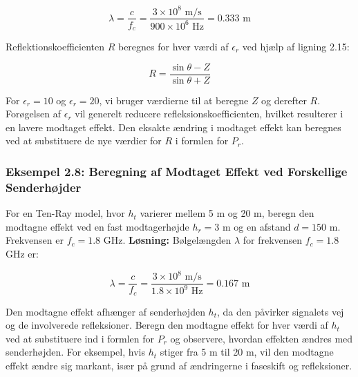 \documentclass[a4paper,12pt]{book}
\begin{document}
	\[
	\lambda = \frac{c}{f_c} = \frac{3 \times 10^8 \text{ m/s}}{900 \times 10^6 \text{ Hz}} = 0.333 \text{ m}
	\]
	
	\noindent Reflektionskoefficienten \( R \) beregnes for hver værdi af \( \epsilon_r \) ved hjælp af ligning 2.15:
	
	\[
	R = \frac{\sin \theta - Z}{\sin \theta + Z}
	\]
	
	\noindent For \( \epsilon_r = 10 \) og \( \epsilon_r = 20 \), vi bruger værdierne til at beregne \( Z \) og derefter \( R \). Forøgelsen af \( \epsilon_r \) vil generelt reducere refleksionskoefficienten, hvilket resulterer i en lavere modtaget effekt. Den eksakte ændring i modtaget effekt kan beregnes ved at substituere de nye værdier for \( R \) i formlen for \( P_r \).
	
	\subsubsection{Eksempel 2.8: Beregning af Modtaget Effekt ved Forskellige Senderhøjder}
	For en Ten-Ray model, hvor \( h_t \) varierer mellem 5 m og 20 m, beregn den modtagne effekt ved en fast modtagerhøjde \( h_r = 3 \) m og en afstand \( d = 150 \) m. Frekvensen er \( f_c = 1.8 \) GHz.
	\newline\newline
	\noindent \textbf{Løsning:} Bølgelængden \( \lambda \) for frekvensen \( f_c = 1.8 \) GHz er:
	
	\[
	\lambda = \frac{c}{f_c} = \frac{3 \times 10^8 \text{ m/s}}{1.8 \times 10^9 \text{ Hz}} = 0.167 \text{ m}
	\]
	
	\noindent Den modtagne effekt afhænger af senderhøjden \( h_t \), da den påvirker signalets vej og de involverede refleksioner. Beregn den modtagne effekt for hver værdi af \( h_t \) ved at substituere ind i formlen for \( P_r \) og observere, hvordan effekten ændres med senderhøjden. For eksempel, hvis \( h_t \) stiger fra 5 m til 20 m, vil den modtagne effekt ændre sig markant, især på grund af ændringerne i faseskift og refleksioner.
	
	
	
\end{document}
